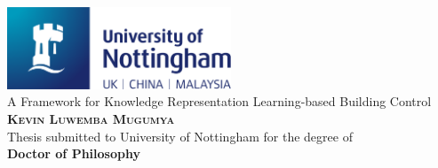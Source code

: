 \begin{titlepage}

\newcommand{\HRule}{\rule{\linewidth}{0.5mm}} %

\center %

\includegraphics[width=0.5\textwidth]{figures/nottingham-logo.png}\\[3.0cm]


\vspace*{0.5cm}
{ \fontsize{35pt}{35pt}\selectfont A Framework for Knowledge Representation Learning-based Building Control}\\[1.0cm] 

\Large \textsc{\textbf{Kevin Luwemba Mugumya}}\\[3.0cm]

\large Thesis submitted to University of Nottingham for the degree of\\[0cm]

\large \textbf{Doctor of Philosophy}\\[4.0cm]





\end{titlepage}
